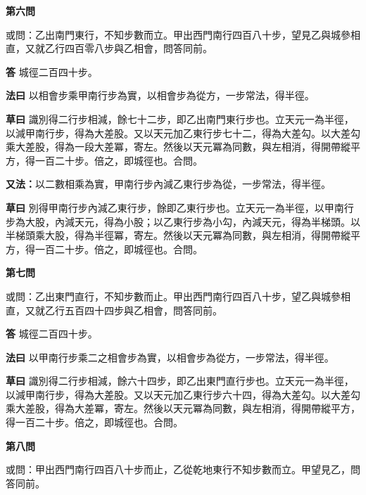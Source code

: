 \documentclass[11pt,a4paper]{article}
\newcommand{\problem}[1]{\par\noindent\textbf{\color{problemcolor}#1}\par\nopagebreak}
\newcommand{\answer}[1]{\par\noindent\textbf{答} #1\par}
\newcommand{\method}[1]{\par\noindent\textbf{法曰} #1\par}
\newcommand{\workings}[1]{\par\noindent\textbf{草曰} #1\par}
\begin{document}
\vspace{0.5cm}

\problem{第六問}

\noindent 或問：乙出南門東行，不知步數而立。甲出西門南行四百八十步，望見乙與城參相直，又就乙行四百零八步與乙相會，問答同前。

\answer{城徑二百四十步。}

\method{以相會步乘甲南行步為實，以相會步為從方，一步常法，得半徑。}

\workings{識別得二行步相減，餘七十二步，即乙出南門東行步也。立天元一為半徑，以減甲南行步，得為大差股。又以天元加乙東行步七十二，得為大差勾。以大差勾乘大差股，得為一段大差冪，寄左。然後以天元冪為同數，與左相消，得開帶縱平方，得一百二十步。倍之，即城徑也。合問。}

\vspace{0.3cm}

\noindent\textbf{又法：}以二數相乘為實，甲南行步內減乙東行步為從，一步常法，得半徑。

\workings{別得甲南行步內減乙東行步，餘即乙東行步也。立天元一為半徑，以甲南行步為大股，內減天元，得為小股；以乙東行步為小勾，內減天元，得為半梯頭。以半梯頭乘大股，得為半徑冪，寄左。然後以天元冪為同數，與左相消，得開帶縱平方，得一百二十步。倍之，即城徑也。合問。}

\vspace{0.5cm}

\problem{第七問}

\noindent 或問：乙出東門直行，不知步數而止。甲出西門南行四百八十步，望乙與城參相直，又就乙行五百四十四步與乙相會，問答同前。

\answer{城徑二百四十步。}

\method{以甲南行步乘二之相會步為實，以相會步為從方，一步常法，得半徑。}

\workings{識別得二行步相減，餘六十四步，即乙出東門直行步也。立天元一為半徑，以減甲南行步，得為大差股。又以天元加乙東行步六十四，得為大差勾。以大差勾乘大差股，得為大差冪，寄左。然後以天元冪為同數，與左相消，得開帶縱平方，得一百二十步。倍之，即城徑也。合問。}

\vspace{0.5cm}

\problem{第八問}

\noindent 或問：甲出西門南行四百八十步而止，乙從乾地東行不知步數而立。甲望見乙，問答同前。
\end{document}
